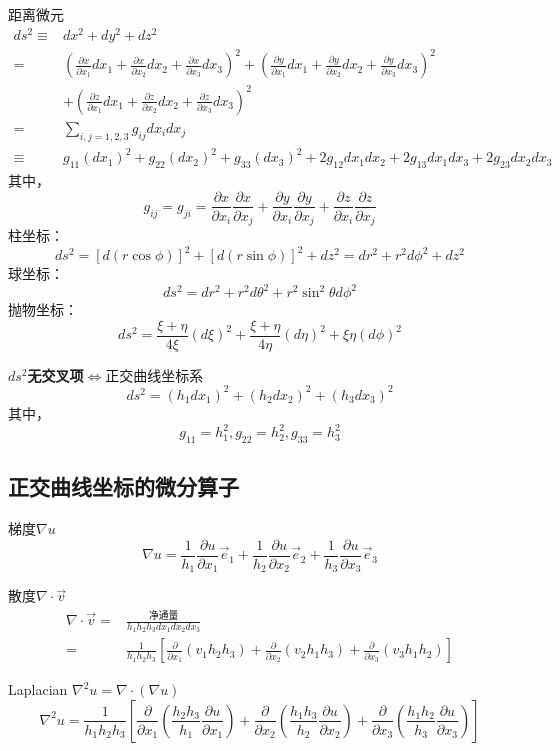 距离微元
$$\begin{aligned}
    ds^2\equiv&dx^2+dy^2+dz^2\\
    =&\left(\frac{\partial x}{\partial x_1}dx_1+\frac{\partial x}{\partial x_2}dx_2+\frac{\partial x}{\partial x_3}dx_3\right)^2+\left(\frac{\partial y}{\partial x_1}dx_1+\frac{\partial y}{\partial x_2}dx_2+\frac{\partial y}{\partial x_3}dx_3\right)^2\\
    &+\left(\frac{\partial z}{\partial x_1}dx_1+\frac{\partial z}{\partial x_2}dx_2+\frac{\partial z}{\partial x_3}dx_3\right)^2\\
    =&\sum_{i,j=1,2,3}g_{ij}dx_idx_j\\
    \equiv&g_{11}(dx_1)^2+g_{22}(dx_2)^2+g_{33}(dx_3)^2+2g_{12}dx_1dx_2+2g_{13}dx_1dx_3+2g_{23}dx_2dx_3
\end{aligned}$$
其中，
$$g_{ij}=g_{ji}=\frac{\partial x}{\partial x_i}\frac{\partial x}{\partial x_j}+\frac{\partial y}{\partial x_i}\frac{\partial y}{\partial x_j}+\frac{\partial z}{\partial x_i}\frac{\partial z}{\partial x_j}$$
柱坐标：$$ds^2=[d(r\cos\phi)]^2+[d(r\sin\phi)]^2+dz^2=dr^2+r^2d\phi^2+dz^2$$
球坐标：$$ds^2=dr^2+r^2d\theta^2+r^2\sin^2\theta d\phi^2$$
抛物坐标：$$ds^2=\frac{\xi+\eta}{4\xi}(d\xi)^2+\frac{\xi+\eta}{4\eta}(d\eta)^2+\xi\eta(d\phi)^2$$
\begin{thm}[度规法]
    $ds^2$\textbf{无交叉项}$\Leftrightarrow$正交曲线坐标系
$$ds^2=(h_1dx_1)^2+(h_2dx_2)^2+(h_3dx_3)^2$$
其中，
$$g_{11}=h_1^2,g_{22}=h_2^2,g_{33}=h_3^2$$
\end{thm}



\subsection{正交曲线坐标的微分算子}
梯度$\nabla u$
$$\nabla u=\frac{1}{h_1 }\frac{\partial u}{\partial x_1}\vec{e}_1+\frac{1}{h_2 }\frac{\partial u}{\partial x_2}\vec{e}_2+\frac{1}{h_3 }\frac{\partial u}{\partial x_3}\vec{e}_3$$

散度$\nabla\cdot\vec{v}$
$$\begin{aligned}
    \nabla\cdot\vec v=&\frac{\mbox{净通量}}{h_1h_2h_3dx_1dx_2dx_3}\\=&\frac{1}{h_1h_2h_3}\left[\frac{\partial}{\partial x_1}(v_1h_2h_3)+\frac{\partial}{\partial x_2}(v_2h_1h_3)+\frac{\partial}{\partial x_3}(v_3h_1h_2)\right]
    \end{aligned}$$

Laplacian $\nabla^2u=\nabla\cdot(\nabla u)$
$$
\nabla^2u=\frac{1}{h_1h_2h_3}\left[\frac{\partial}{\partial x_1}\left(\frac{h_2h_3}{h_1}\frac{\partial u}{\partial x_1}\right)+\frac{\partial}{\partial x_2}\left(\frac{h_1h_3}{h_2}\frac{\partial u}{\partial x_2}\right)+\frac{\partial}{\partial x_3}\left(\frac{h_1h_2}{h_3}\frac{\partial u}{\partial x_3}\right)\right]
$$

